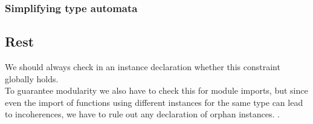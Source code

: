\subsubsection{Simplifying type automata}




\subsection{Rest}
We should always check in an instance declaration whether this constraint globally holds. \\
To guarantee modularity we also have to check this for module imports, but since even the import of functions using different instances for the same type can lead to incoherences, we have to rule out any declaration of orphan instances.
\cite{Kilpatrick2019-cy}.
